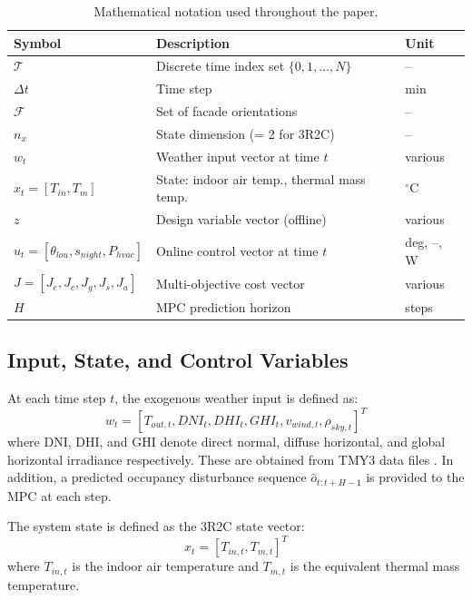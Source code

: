 \documentclass[5p,times,twocolumn]{elsarticle}
\begin{document}
\begin{table}[!t]
\centering
\footnotesize
\caption{Mathematical notation used throughout the paper.}
\label{tab:notation}
\begin{tabularx}{\columnwidth}{@{} l >{\raggedright\arraybackslash}X l @{}}
\toprule
\textbf{Symbol} & \textbf{Description} & \textbf{Unit} \\
\midrule
$\mathcal{T}$ & Discrete time index set $\{0,1,\ldots,N\}$ & -- \\
$\Delta t$ & Time step & min \\
$\mathcal{F}$ & Set of facade orientations & -- \\
$n_x$ & State dimension (= 2 for 3R2C) & -- \\
$w_t$ & Weather input vector at time $t$ & various \\
$x_t = [T_{in}, T_m]$ & State: indoor air temp., thermal mass temp. & $^\circ$C \\
$z$ & Design variable vector (offline) & various \\
$u_t = [\theta_{lou}, s_{night}, P_{hvac}]$ & Online control vector at time $t$ & deg, --, W \\
$J = [J_e, J_c, J_g, J_s, J_a]$ & Multi-objective cost vector & various \\
$H$ & MPC prediction horizon & steps \\
\bottomrule
\end{tabularx}
\end{table}

\subsection{Input, State, and Control Variables}

At each time step $t$, the exogenous weather input is defined as:
\begin{equation}
\label{eq:weather}
w_t = [T_{out,t}, DNI_t, DHI_t, GHI_t, v_{wind,t}, \rho_{sky,t}]^T
\end{equation}
where DNI, DHI, and GHI denote direct normal, diffuse horizontal, and global horizontal irradiance respectively. These are obtained from TMY3 data files \cite{wilcox2008}. In addition, a predicted occupancy disturbance sequence $\hat{o}_{t:t+H-1}$ is provided to the MPC at each step.

The system state is defined as the 3R2C state vector:
\begin{equation}
\label{eq:state}
x_t = [T_{in,t}, T_{m,t}]^T
\end{equation}
where $T_{in,t}$ is the indoor air temperature and $T_{m,t}$ is the equivalent thermal mass temperature.
\end{document}
